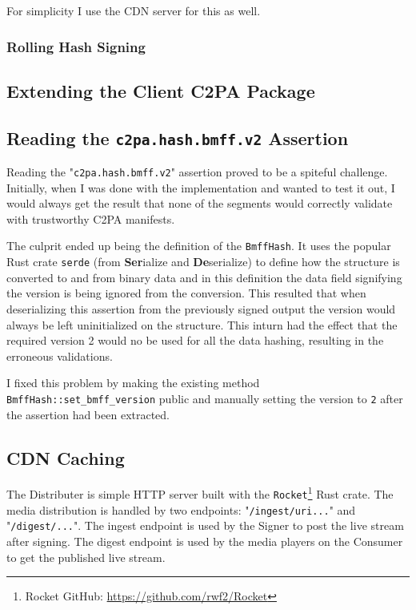 For simplicity I use the CDN server for this as well.

\subsubsection{Rolling Hash Signing\label{sec:rolling_hash_sign}}


\subsection{Extending the Client C2PA Package\label{sec:wasm}}


\subsection{Reading the \texttt{c2pa.hash.bmff.v2} Assertion}

Reading the "\texttt{c2pa.hash.bmff.v2}" assertion proved to be a spiteful challenge. Initially, when I was done with the implementation and wanted to test it out, I would always get the result that none of the segments would correctly validate with trustworthy C2PA manifests.

The culprit ended up being the definition of the \texttt{BmffHash}. It uses the popular Rust crate \texttt{serde} (from \textbf{Ser}ialize and \textbf{De}serialize) to define how the structure is converted to and from binary data and in this definition the data field signifying the version is being ignored from the conversion. This resulted that when deserializing this assertion from the previously signed output the version would always be left uninitialized on the structure. This inturn had the effect that the required version 2 would no be used for all the data hashing, resulting in the erroneous validations.

I fixed this problem by making the existing method \texttt{BmffHash::set\_bmff\_version} public and manually setting the version to \texttt{2} after the assertion had been extracted.

\subsection{CDN Caching\label{sec:caching}}

The Distributer is simple HTTP server built with the \texttt{Rocket}\footnote{Rocket GitHub: \url{https://github.com/rwf2/Rocket}} Rust crate. The media distribution is handled by two endpoints: "\texttt{/ingest/uri...}" and "\texttt{/digest/...}". The ingest endpoint is used by the Signer to post the live stream after signing. The digest endpoint is used by the media players on the Consumer to get the published live stream.

